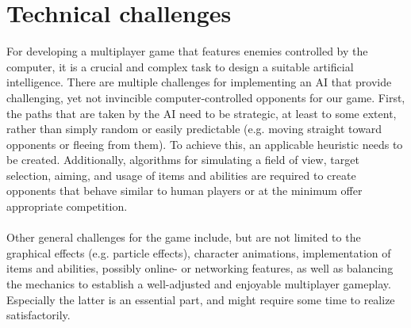\documentclass[10pt,a4paper]{article}
\begin{document}
\section{Technical challenges}

For developing a multiplayer game that features enemies controlled by
the computer, it is a crucial and complex task to design a suitable
artificial intelligence. There are multiple challenges for implementing
an AI that provide challenging, yet not invincible computer-controlled
opponents for our game. First, the paths that are taken by the AI need
to be strategic, at least to some extent, rather than simply random or
easily predictable (e.g. moving straight toward opponents or fleeing
from them). To achieve this, an applicable heuristic needs to be
created. Additionally, algorithms for simulating a field of view, target
selection, aiming, and usage of items and abilities are required to
create opponents that behave similar to human players or at the minimum
offer appropriate competition.\\
\\
Other general challenges for the game include, but are not limited to
the graphical effects (e.g. particle effects), character animations,
implementation of items and abilities, possibly online- or networking
features, as well as balancing the mechanics to establish a
well-adjusted and enjoyable multiplayer gameplay. Especially the latter
is an essential part, and might require some time to realize satisfactorily.
\end{document}
